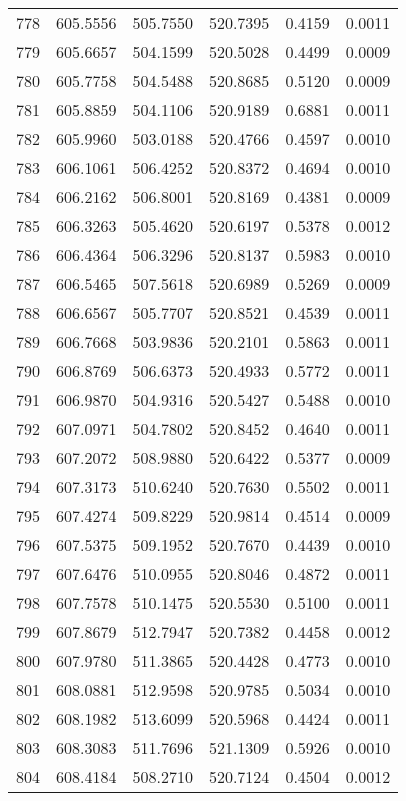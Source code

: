 \documentclass{article}
\begin{document}
\begin{longtable}{|c|c|c|c|c|c|}
778 & 605.5556 & 505.7550 & 520.7395 & 0.4159 & 0.0011 \\
779 & 605.6657 & 504.1599 & 520.5028 & 0.4499 & 0.0009 \\
780 & 605.7758 & 504.5488 & 520.8685 & 0.5120 & 0.0009 \\
781 & 605.8859 & 504.1106 & 520.9189 & 0.6881 & 0.0011 \\
782 & 605.9960 & 503.0188 & 520.4766 & 0.4597 & 0.0010 \\
783 & 606.1061 & 506.4252 & 520.8372 & 0.4694 & 0.0010 \\
784 & 606.2162 & 506.8001 & 520.8169 & 0.4381 & 0.0009 \\
785 & 606.3263 & 505.4620 & 520.6197 & 0.5378 & 0.0012 \\
786 & 606.4364 & 506.3296 & 520.8137 & 0.5983 & 0.0010 \\
787 & 606.5465 & 507.5618 & 520.6989 & 0.5269 & 0.0009 \\
788 & 606.6567 & 505.7707 & 520.8521 & 0.4539 & 0.0011 \\
789 & 606.7668 & 503.9836 & 520.2101 & 0.5863 & 0.0011 \\
790 & 606.8769 & 506.6373 & 520.4933 & 0.5772 & 0.0011 \\
791 & 606.9870 & 504.9316 & 520.5427 & 0.5488 & 0.0010 \\
792 & 607.0971 & 504.7802 & 520.8452 & 0.4640 & 0.0011 \\
793 & 607.2072 & 508.9880 & 520.6422 & 0.5377 & 0.0009 \\
794 & 607.3173 & 510.6240 & 520.7630 & 0.5502 & 0.0011 \\
795 & 607.4274 & 509.8229 & 520.9814 & 0.4514 & 0.0009 \\
796 & 607.5375 & 509.1952 & 520.7670 & 0.4439 & 0.0010 \\
797 & 607.6476 & 510.0955 & 520.8046 & 0.4872 & 0.0011 \\
798 & 607.7578 & 510.1475 & 520.5530 & 0.5100 & 0.0011 \\
799 & 607.8679 & 512.7947 & 520.7382 & 0.4458 & 0.0012 \\
800 & 607.9780 & 511.3865 & 520.4428 & 0.4773 & 0.0010 \\
801 & 608.0881 & 512.9598 & 520.9785 & 0.5034 & 0.0010 \\
802 & 608.1982 & 513.6099 & 520.5968 & 0.4424 & 0.0011 \\
803 & 608.3083 & 511.7696 & 521.1309 & 0.5926 & 0.0010 \\
804 & 608.4184 & 508.2710 & 520.7124 & 0.4504 & 0.0012 \\

\end{longtable}
\end{document}
